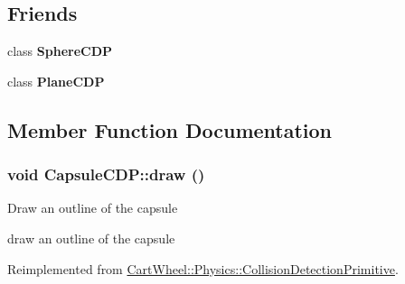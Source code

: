 \subsection*{Friends}
\begin{DoxyCompactItemize}
\item 
\hypertarget{classCartWheel_1_1Physics_1_1CapsuleCDP_a67bc19fca1dc4df1cab00735e1b322cb}{
class {\bfseries SphereCDP}}
\label{classCartWheel_1_1Physics_1_1CapsuleCDP_a67bc19fca1dc4df1cab00735e1b322cb}

\item 
\hypertarget{classCartWheel_1_1Physics_1_1CapsuleCDP_a68aee07728ec396783609f2824c610f8}{
class {\bfseries PlaneCDP}}
\label{classCartWheel_1_1Physics_1_1CapsuleCDP_a68aee07728ec396783609f2824c610f8}

\end{DoxyCompactItemize}


\subsection{Member Function Documentation}
\hypertarget{classCartWheel_1_1Physics_1_1CapsuleCDP_a0b2d496f52bbe790ea08846e0f951d63}{
\subsubsection[{draw}]{\setlength{\rightskip}{0pt plus 5cm}void CapsuleCDP::draw ()}}
\label{classCartWheel_1_1Physics_1_1CapsuleCDP_a0b2d496f52bbe790ea08846e0f951d63}
Draw an outline of the capsule

draw an outline of the capsule 

Reimplemented from \hyperlink{classCartWheel_1_1Physics_1_1CollisionDetectionPrimitive_a26c85561d35a7df8bb48697da9c1cb10}{CartWheel::Physics::CollisionDetectionPrimitive}.

